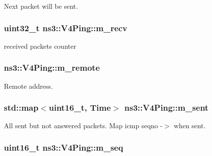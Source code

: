 Next packet will be sent. 

\subsubsection[{\texorpdfstring{m\+\_\+recv}{m_recv}}]{\setlength{\rightskip}{0pt plus 5cm}uint32\+\_\+t ns3\+::\+V4\+Ping\+::m\+\_\+recv\hspace{0.3cm}{\ttfamily [private]}}\hypertarget{classns3_1_1V4Ping_a20b535b432481efa2e45d398de3080e1}{}\label{classns3_1_1V4Ping_a20b535b432481efa2e45d398de3080e1}


received packets counter 

\subsubsection[{\texorpdfstring{m\+\_\+remote}{m_remote}}]{ ns3\+::\+V4\+Ping\+::m\+\_\+remote\hspace{0.3cm}{\ttfamily [private]}}\hypertarget{classns3_1_1V4Ping_a30b2005deccba89dc440a120853864f2}{}\label{classns3_1_1V4Ping_a30b2005deccba89dc440a120853864f2}


Remote address. 

\subsubsection[{\texorpdfstring{m\+\_\+sent}{m_sent}}]{\setlength{\rightskip}{0pt plus 5cm}std\+::map$<$uint16\+\_\+t, {\bf Time}$>$ ns3\+::\+V4\+Ping\+::m\+\_\+sent\hspace{0.3cm}{\ttfamily [private]}}\hypertarget{classns3_1_1V4Ping_ad26f6eafcdbf6a787900a6c77099ef6e}{}\label{classns3_1_1V4Ping_ad26f6eafcdbf6a787900a6c77099ef6e}


All sent but not answered packets. Map icmp seqno -\/$>$ when sent. 

\subsubsection[{\texorpdfstring{m\+\_\+seq}{m_seq}}]{\setlength{\rightskip}{0pt plus 5cm}uint16\+\_\+t ns3\+::\+V4\+Ping\+::m\+\_\+seq\hspace{0.3cm}{\ttfamily [private]}}\hypertarget{classns3_1_1V4Ping_a6575afe89682fff8b490075425d8157e}{}\label{classns3_1_1V4Ping_a6575afe89682fff8b490075425d8157e}


